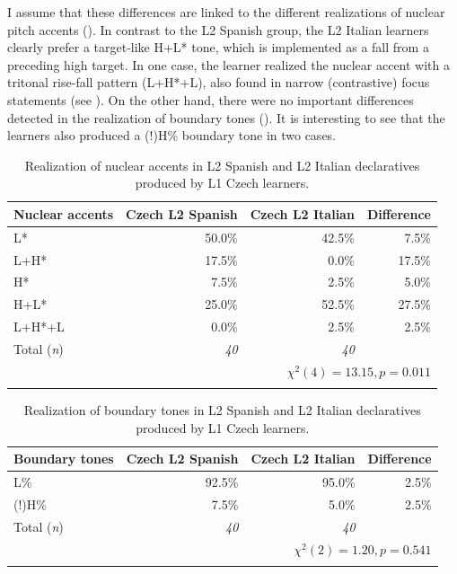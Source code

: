 I assume that these differences are linked to the different realizations of nuclear pitch accents (). In contrast to the L2 Spanish group, the L2 Italian learners clearly prefer a target-like H+L* tone, which is implemented as a fall from a preceding high target. In one case, the learner realized the nuclear accent with a tritonal rise-fall pattern (L+H*+L), also found in narrow (contrastive) focus statements (see ). On the other hand, there were no important differences detected in the realization of boundary tones (). It is interesting to see that the learners also produced a (!)H\% boundary tone in two cases.

\begin{table}
\begin{tabularx}{\textwidth}{Qrrr}

\lsptoprule

{Nuclear accents} & {Czech L2 Spanish} & {Czech L2 Italian} & {Difference}\\
\midrule
L* &  50.0\% &  42.5\% &  7.5\%\\
L+H* &  17.5\% &  0.0\% & 17.5\%\\
H* &  7.5\% &  2.5\% &  5.0\%\\
H+L* &  25.0\% &  52.5\% &  27.5\%\\
L+H*+L &  0.0\% & 2.5\% &  2.5\%\\
\midrule
Total (\textit{n}) & {\itshape 40} & {\itshape 40} &  \\
\\
\lspbottomrule
\end{tabularx}

\caption{Realization of nuclear accents in L2 Spanish and L2 Italian declaratives produced by L1 Czech learners.}
\label{tab:4.8}
\end{table}

\begin{table}
\begin{tabularx}{\textwidth}{Qrrr}

\lsptoprule

{Boundary tones} & {Czech L2 Spanish} & {Czech L2 Italian} & {Difference}\\
\midrule
L\% &  92.5\% &  95.0\% &  2.5\%\\
(!)H\% &  7.5\% &  5.0\% &  2.5\%\\
\midrule
Total (\textit{n}) & {\itshape 40} & {\itshape 40} &  \\
\\
\lspbottomrule
\end{tabularx}

\caption{Realization of boundary tones in L2 Spanish and L2 Italian declaratives produced by L1 Czech learners.}
\label{tab:4.9}
\end{table}

